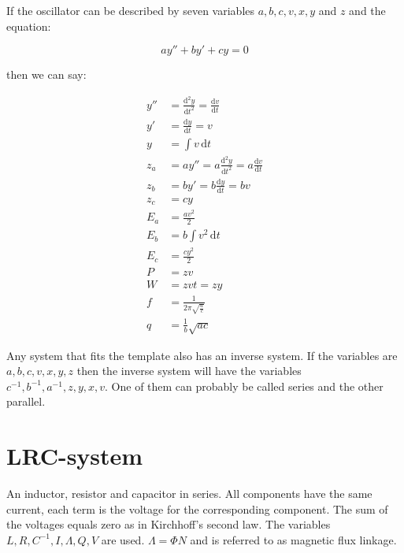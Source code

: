 \documentclass[]{elementary-physics}
\begin{document}
If the oscillator can be described by seven variables $a,b,c,v,x,y$ and $z$ and the equation:

\begin{equation}
a y'' + b y' + c y = 0
\end{equation}

then we can say:

\begin{subequations}
\begin{align}
y'' &= \frac{\mathrm{d}^2 y}{\mathrm{d}t^2} = \frac{\mathrm{d}v}{\mathrm{d}t} \\
y' &= \frac{\mathrm{d}y}{\mathrm{d}t} = v \\
y &= \int v \, \mathrm{d}t \\
z_a &= a y'' = a \frac{\mathrm{d}^2 y}{\mathrm{d}t^2} = a \frac{\mathrm{d}v}{\mathrm{d}t} \\
z_b &= b y' = b \frac{\mathrm{d}y}{\mathrm{d}t} = b v \\
z_c &= c y \\
E_a &= \frac{a v^2}{2} \tag{energy} \\
E_b &= b \int v^2 \, \mathrm{d}t \tag{losses} \\
E_c &= \frac{c y^2}{2} \tag{energy} \\
P &= z v \tag{power} \\
W &= z v t = z y \tag{work} \\
f &= \frac{1}{2 \pi \sqrt{\frac{a}{c}}} \tag{frequency} \\
q &= \frac{1}{b} \sqrt{a c} \tag{quality factor}
\end{align}
\end{subequations}

Any system that fits the template also has an inverse system.
If the variables are $a,b,c,v,x,y,z$ then the inverse system will have the variables $c^{-1},b^{-1},a^{-1},z,y,x,v$.
One of them can probably be called series and the other parallel.

\pagebreak

\section{LRC-system}

An inductor, resistor and capacitor in series.
All components have the same current, each term is the voltage for the corresponding component.
The sum of the voltages equals zero as in Kirchhoff's second law.
The variables $L,R,C^{-1},I,\Lambda,Q,V$ are used.
$\Lambda = \Phi N$ and is referred to as magnetic flux linkage.
\end{document}
